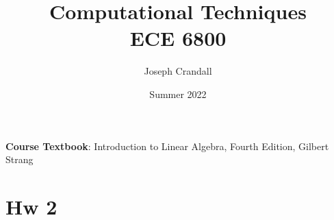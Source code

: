 
\usepackage{algorithm, algpseudocode, bm, color, gensymb, listings, siunitx, soul, subfiles, verbatim}
\usepackage[a4paper, total={7.5in, 10in}]{geometry}

\title{Computational Techniques\\
\large ECE 6800}
\author{Joseph Crandall}
\date{Summer 2022}


\maketitle

\textbf{Course Textbook}: Introduction to Linear Algebra, Fourth Edition, Gilbert Strang

\begin{comment}

\section{Lecture 1 Vectors and Matrices}


\section{Hw 1}


\section{Lecture 2}


\end{comment}

\section{Hw 2}


\begin{comment}

\section{Lecture 3}


\section{HW 3}


\section{Lecture 4}


\section{HW 4}


\end{comment}


